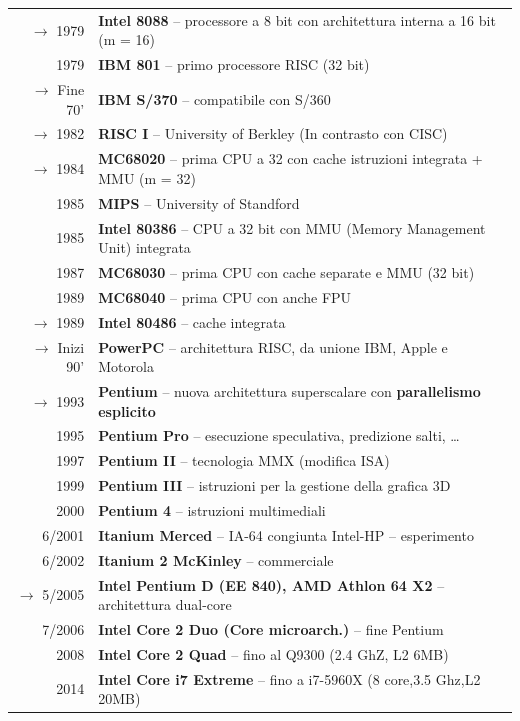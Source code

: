 \documentclass{article}
\begin{document}
{\begin{tabular}{r |@{\foo} l}
			$\rightarrow$ 1979 & \textbf{Intel 8088} – processore a 8 bit con architettura interna a 16 bit (m = 16)\\
			1979 & \textbf{IBM 801} – primo processore RISC (32 bit)\\
			$\rightarrow$ Fine 70' & \textbf{IBM S/370} – compatibile con S/360\\
			$\rightarrow$ 1982 & \textbf{RISC I} – University of Berkley (In contrasto con CISC)\\
			$\rightarrow$ 1984 & \textbf{MC68020} – prima CPU a 32 con cache istruzioni integrata + MMU (m = 32)\\
			1985 & \textbf{MIPS} – University of Standford\\
			1985 & \textbf{Intel 80386} – CPU a 32 bit con MMU (Memory Management Unit) integrata\\
			1987 & \textbf{MC68030} – prima CPU con cache separate e MMU (32 bit)\\
			1989 & \textbf{MC68040} – prima CPU con anche FPU\\
			$\rightarrow$ 1989 & \textbf{Intel 80486} – cache integrata\\
			$\rightarrow$ Inizi 90' & \textbf{PowerPC} – architettura RISC, da unione IBM, Apple e Motorola\\
			$\rightarrow$ 1993 & \textbf{Pentium} – nuova architettura superscalare con \textbf{parallelismo esplicito}\\
			1995 & \textbf{Pentium Pro} – esecuzione speculativa, predizione salti, … \\
			1997 & \textbf{Pentium II} – tecnologia MMX (modifica ISA)\\
			1999 & \textbf{Pentium III} – istruzioni per la gestione della grafica 3D\\
			2000 & \textbf{Pentium 4} – istruzioni multimediali\\
			6/2001 & \textbf{Itanium Merced} – IA-64 congiunta Intel-HP – esperimento\\
			6/2002 & \textbf{Itanium 2 McKinley} – commerciale\\
			$\rightarrow$ 5/2005 & \textbf{Intel Pentium D (EE 840), AMD Athlon 64 X2} – architettura dual-core\\
			7/2006 & \textbf{Intel Core 2 Duo (Core microarch.)} – fine Pentium\\
			2008 & \textbf{Intel Core 2 Quad} – fino al Q9300 (2.4 GhZ, L2 6MB)\\
			2014 & \textbf{Intel Core i7 Extreme} – fino a i7-5960X (8 core,3.5 Ghz,L2 20MB)\\
		\end{tabular}
	}
\end{document}
